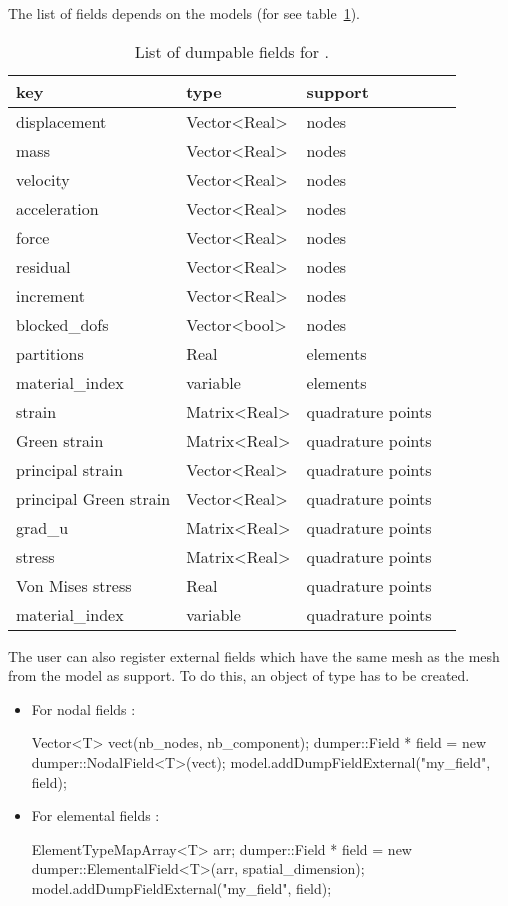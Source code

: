 The list of fields depends on the models (for
 see table~\ref{tab:io:smm_field_list}).

\begin{table}
  \centering
  \begin{tabular}{llll}
    \toprule
    key          &    type      & support \\
    \midrule
    displacement & Vector<Real> & nodes  \\
    mass         & Vector<Real> & nodes  \\
    velocity     & Vector<Real> & nodes  \\
    acceleration & Vector<Real> & nodes  \\
    force	       & Vector<Real> & nodes  \\
    residual     & Vector<Real> & nodes  \\
    increment     & Vector<Real> & nodes  \\
    {blocked\_dofs}  & Vector<bool> & nodes  \\    
    partitions   & Real         & elements \\
    material\_index & variable  & elements\\    
    strain & Matrix<Real> & quadrature points  \\
    Green strain & Matrix<Real> & quadrature points  \\
    principal strain & Vector<Real> & quadrature points  \\
    principal Green strain & Vector<Real> & quadrature points  \\
    grad\_u & Matrix<Real> & quadrature points  \\    
    stress & Matrix<Real> & quadrature points  \\
    Von Mises stress & Real & quadrature points  \\        
    material\_index & variable  & quadrature points \\
    \bottomrule
  \end{tabular}
  \caption{List of dumpable fields for .}
  \label{tab:io:smm_field_list}
\end{table}

The user can also register external fields which have the same mesh as the mesh from the model as support. To do this, an object of type  has to be created.

\begin{itemize}
\item For nodal fields :
\begin{cpp}
  Vector<T> vect(nb_nodes, nb_component);
  dumper::Field * field = new dumper::NodalField<T>(vect);
  model.addDumpFieldExternal("my_field", field);
\end{cpp}

\item For elemental fields :
\begin{cpp}
  ElementTypeMapArray<T> arr;
  dumper::Field * field = new dumper::ElementalField<T>(arr, spatial_dimension);
  model.addDumpFieldExternal("my_field", field);
\end{cpp}
\end{itemize}

